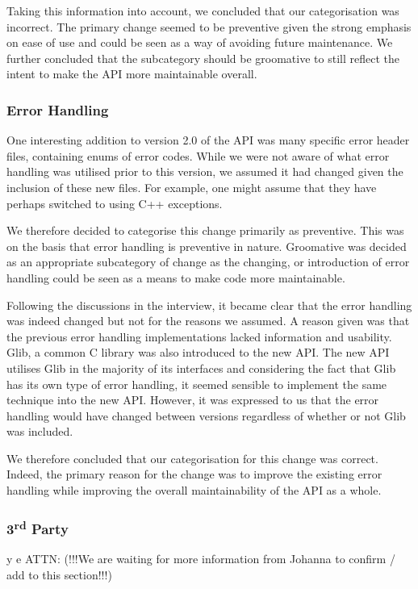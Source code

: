 \documentclass{sig-alternate}
\begin{document}
Taking this information into account, we concluded that our categorisation was incorrect. The primary change seemed to be preventive given the strong emphasis on ease of use and could be seen as a way of avoiding future maintenance. We further concluded that the subcategory should be groomative to still reflect the intent to make the API more maintainable overall.


\subsubsection{Error Handling}

One interesting addition to version 2.0 of the API was many specific error header files, containing enums of error codes. While we were not aware of what error handling was utilised prior to this version, we assumed it had changed given the inclusion of these new files. For example, one might assume that they have perhaps switched to using C++ exceptions.

We therefore decided to categorise this change primarily as preventive. This was on the basis that error handling is preventive in nature. Groomative was decided as an appropriate subcategory of change as the changing, or introduction of error handling could be seen as a means to make code more maintainable. 

Following the discussions in the interview, it became clear that the error handling was indeed changed but not for the reasons we assumed. A reason given was that the previous error handling implementations lacked information and usability. Glib, a common C library was also introduced to the new API. The new API utilises Glib in the majority of its interfaces and considering the fact that Glib has its own type of error handling, it seemed sensible to implement the same technique into the new API. However, it was expressed to us that the error handling would have changed between versions regardless of whether or not Glib was included.

We therefore concluded that our categorisation for this change was correct. Indeed, the primary reason for the change was to improve the existing error handling while improving the overall maintainability of the API as a whole. 

\subsubsection{3\textsuperscript{rd} Party}y e
ATTN: (!!!We are waiting for more information from Johanna to confirm / add to this section!!!)
\end{document}
